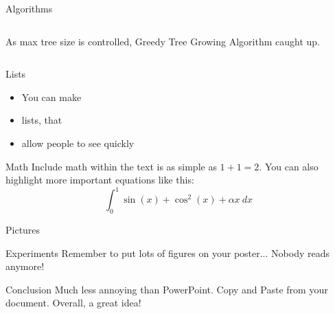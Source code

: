 \documentclass[serif,mathserif,final]{beamer}
\begin{document}
\begin{frame}{}
\begin{columns}[t]
\begin{column}{0.49\linewidth}
\begin{block}{\Huge Algorithms}
\begin{columns}[t]
\begin{column}{0.51\linewidth}
{					As max tree size is controlled,
					Greedy Tree Growing Algorithm caught up.
				}
			\end{column}
		\end{columns}

      \end{block}

      \begin{block}{Lists}
        \begin{itemize}
          \item You can make
          \item lists, that
          \item allow people to see quickly
        \end{itemize}
      \end{block}

      \begin{block}{Math}
        Include math within the text is as simple as $1+1=2$.  You can also
        highlight more important equations like this:
        \begin{equation*}
          \int_0^1\sin(x)+\cos^2(x)+\alpha x~d\!x
        \end{equation*}
      \end{block}


      \begin{block}{Pictures}
        \begin{figure}[htb]
          \centering
        \end{figure}
      \end{block}

      \begin{block}{Experiments}
        Remember to put lots of figures on your poster... Nobody reads anymore!
      \end{block}

      \begin{block}{Conclusion}
        Much less annoying than PowerPoint.  Copy and Paste from your
        document. Overall, a great idea!
      \end{block}

    \end{column}%

% 

  \end{columns}
\end{frame}
\end{document}
